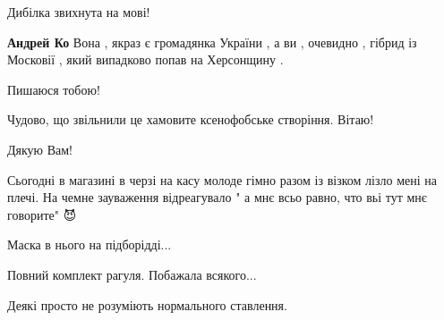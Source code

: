 \begin{itemize}
 
Дибілка звихнута на мові!

\begin{itemize}
 
\textbf{Андрей Ко} Вона , якраз є громадянка України , а ви , очевидно , гібрид із Московії , який випадково попав на Херсонщину .
\end{itemize}

 
Пишаюся тобою!

 
Чудово, що звільнили це хамовите ксенофобське створіння. Вітаю!

 

Дякую Вам!

Сьогодні в магазині в черзі на касу молоде гімно разом із візком лізло мені на
плечі. На чемне зауваження відреагувало " а мнє всьо равно, что вьі тут мнє
говорите" 😈

Маска в нього на підборідді...

Повний комплект рагуля. Побажала всякого...

Деякі просто не розуміють нормального ставлення.

\begin{itemize}
 

\end{itemize}
\end{itemize}
